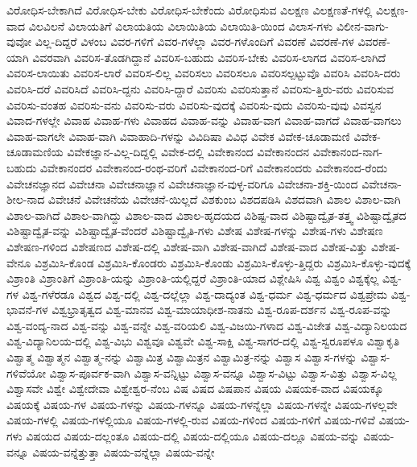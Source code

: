 {ವಿರೋಧಿಸ-ಬೇಕಾಗಿದೆ
ವಿರೋಧಿಸ-ಬೇಕು
ವಿರೋಧಿಸ-ಬೇಕೆಂದು
ವಿರೋಧಿಸುವ
ವಿಲಕ್ಷಣ
ವಿಲಕ್ಷಣತೆ-ಗಳಲ್ಲಿ
ವಿಲಕ್ಷಣ-ವಾದ
ವಿಲವಿಲನೆ
ವಿಲಾಯತಿಗೆ
ವಿಲಾಯತಿಯ
ವಿಲಾಯಿತಿಯ
ವಿಲಾಯಿತಿ-ಯಿಂದ
ವಿಲಾಸ-ಗಳು
ವಿಲೀನ-ವಾಗು-ವುವೋ
ವಿಲ್ಲ-ದಿದ್ದರೆ
ವಿಳಂಬ
ವಿವರ-ಗಳಿಗೆ
ವಿವರ-ಗಳೆಲ್ಲಾ
ವಿವರ-ಗಳೊಂದಿಗೆ
ವಿವರಣೆ
ವಿವರಣೆ-ಗಳ
ವಿವರಣೆ-ಯಾಗಿ
ವಿವರವಾಗಿ
ವಿವರಿಸ-ತೊಡಗಿದ್ದಾನೆ
ವಿವರಿಸ-ಬಹುದು
ವಿವರಿಸ-ಬೇಕು
ವಿವರಿಸ-ಲಾಗದ
ವಿವರಿಸ-ಲಾಗಿದೆ
ವಿವರಿಸ-ಲಾಯಿತು
ವಿವರಿಸ-ಲಾರೆ
ವಿವರಿಸ-ಲಿಲ್ಲ
ವಿವರಿಸಲು
ವಿವರಿಸಲೂ
ವಿವರಿಸಲ್ಪಟ್ಟುವೊ
ವಿವರಿಸಿ
ವಿವರಿಸಿ-ದರು
ವಿವರಿಸಿ-ದರೆ
ವಿವರಿಸಿದೆ
ವಿವರಿಸಿ-ದ್ದನು
ವಿವರಿಸಿ-ದ್ದಾರೆ
ವಿವರಿಸು
ವಿವರಿಸುತ್ತಾನೆ
ವಿವರಿಸು-ತ್ತಿರು-ವರು
ವಿವರಿಸುವ
ವಿವರಿಸು-ವಂತಹ
ವಿವರಿಸು-ವನು
ವಿವರಿಸು-ವರು
ವಿವರಿಸು-ವುದಕ್ಕೆ
ವಿವರಿಸು-ವುದು
ವಿವರಿಸು-ವುವು
ವಿವಸ್ವನ
ವಿವಾದ-ಗಳಲ್ಲೇ
ವಿವಾಹ
ವಿವಾಹ-ಗಳು
ವಿವಾಹದ
ವಿವಾಹ-ವನ್ನು
ವಿವಾಹ-ವಾಗ
ವಿವಾಹ-ವಾಗದೆ
ವಿವಾಹ-ವಾಗಲು
ವಿವಾಹ-ವಾಗಲೇ
ವಿವಾಹ-ವಾಗಿ
ವಿವಾಹಾದಿ-ಗಳನ್ನು
ವಿವಿದಿಷಾ
ವಿವಿಧ
ವಿವೇಕ
ವಿವೇಕ-ಚೂಡಾಮಣಿ
ವಿವೇಕ-ಚೂಡಾಮಣಿಯ
ವಿವೇಕಜ್ಞಾನ-ವಿಲ್ಲ-ದಿದ್ದಲ್ಲಿ
ವಿವೇಕ-ದಲ್ಲಿ
ವಿವೇಕಾನಂದ
ವಿವೇಕಾನಂದನ
ವಿವೇಕಾನಂದ-ನಾಗ-ಬಹುದು
ವಿವೇಕಾನಂದರ
ವಿವೇಕಾನಂದ-ರಂಥ-ವರಿಗೆ
ವಿವೇಕಾನಂದ-ರಿಗೆ
ವಿವೇಕಾನಂದರು
ವಿವೇಕಾನಂದ-ರೆಂದು
ವಿವೇಚನಜ್ಞಾನದ
ವಿವೇಚನಾ
ವಿವೇಚನಾಜ್ಞಾನ
ವಿವೇಚನಾಜ್ಞಾನ-ವುಳ್ಳ-ವರಿಗೂ
ವಿವೇಚನಾ-ಶಕ್ತಿ-ಯಿಂದ
ವಿವೇಚನಾ-ಶೀಲ-ನಾದ
ವಿವೇಚನೆ
ವಿವೇಚನೆಯ
ವಿವೇಚನೆ-ಯಿಲ್ಲದೆ
ವಿಶಕುಂಬ
ವಿಶದಪಡಿಸಿ
ವಿಶದವಾಗಿ
ವಿಶಾಲ
ವಿಶಾಲ-ವಾಗಿ
ವಿಶಾಲ-ವಾಗಿದೆ
ವಿಶಾಲ-ವಾಗಿದ್ದು
ವಿಶಾಲ-ವಾದ
ವಿಶಾಲ-ಹೃದಯದ
ವಿಶಿಷ್ಟ-ವಾದ
ವಿಶಿಷ್ಟಾದ್ವೈತ-ತತ್ತ್ವ
ವಿಶಿಷ್ಟಾದ್ವೈತದ
ವಿಶಿಷ್ಟಾದ್ವೈತ-ವನ್ನು
ವಿಶಿಷ್ಟಾದ್ವೈತ-ವೆಂದರೆ
ವಿಶಿಷ್ಟಾದ್ವೈತಿ-ಗಳು
ವಿಶೇಷ
ವಿಶೇಷ-ಗಳನ್ನು
ವಿಶೇಷ-ಗಳು
ವಿಶೇಷಣ
ವಿಶೇಷಣ-ಗಳಿಂದ
ವಿಶೇಷಣದ
ವಿಶೇಷ-ದಲ್ಲಿ
ವಿಶೇಷ-ವಾಗಿ
ವಿಶೇಷ-ವಾಗಿದೆ
ವಿಶೇಷ-ವಾದ
ವಿಶೇಷ-ವಿತ್ತು
ವಿಶೇಷ-ವೇನೂ
ವಿಶ್ರಮಿಸಿ-ಕೊಂಡ
ವಿಶ್ರಮಿಸಿ-ಕೊಂಡರು
ವಿಶ್ರಮಿಸಿ-ಕೊಂಡು
ವಿಶ್ರಮಿಸಿ-ಕೊಳ್ಳು-ತ್ತಿದ್ದರು
ವಿಶ್ರಮಿಸಿ-ಕೊಳ್ಳು-ವುದಕ್ಕೆ
ವಿಶ್ರಾಂತಿ
ವಿಶ್ರಾಂತಿಗೆ
ವಿಶ್ರಾಂತಿ-ಯನ್ನು
ವಿಶ್ರಾಂತಿ-ಯಲ್ಲಿದ್ದರೆ
ವಿಶ್ರಾಂತಿ-ಯಾದ
ವಿಶ್ಲೇಷಿಸಿ
ವಿಶ್ವ
ವಿಶ್ವಂ
ವಿಶ್ವಕ್ಕೆಲ್ಲ
ವಿಶ್ವ-ಗಳ
ವಿಶ್ವ-ಗಳೆರಡೂ
ವಿಶ್ವದ
ವಿಶ್ವ-ದಲ್ಲಿ
ವಿಶ್ವ-ದಲ್ಲೆಲ್ಲಾ
ವಿಶ್ವ-ದಾದ್ಯಂತ
ವಿಶ್ವ-ಧರ್ಮ
ವಿಶ್ವ-ಧರ್ಮದ
ವಿಶ್ವಪ್ರೇಮ
ವಿಶ್ವ-ಭಾವನೆ-ಗಳ
ವಿಶ್ವಭ್ರಾತೃತ್ವದ
ವಿಶ್ವ-ಮಾನವ
ವಿಶ್ವ-ಮಾಯಾಧೀಶ-ನಾತನು
ವಿಶ್ವ-ರೂಪ-ದರ್ಶನ
ವಿಶ್ವ-ರೂಪ-ವನ್ನು
ವಿಶ್ವ-ವಂದ್ಯ-ನಾದ
ವಿಶ್ವ-ವನ್ನು
ವಿಶ್ವ-ವನ್ನೇ
ವಿಶ್ವ-ವರಿಯಲಿ
ವಿಶ್ವ-ವಿಜಯಿ-ಗಳಾದ
ವಿಶ್ವ-ವಿಜೇತ
ವಿಶ್ವ-ವಿದ್ಯಾನಿಲಯದ
ವಿಶ್ವ-ವಿದ್ಯಾನಿಲಯ-ದಲ್ಲಿ
ವಿಶ್ವ-ವಿಭು
ವಿಶ್ವವೂ
ವಿಶ್ವವೇ
ವಿಶ್ವ-ಸಾಕ್ಷಿ
ವಿಶ್ವ-ಸಾಗರ-ದಲ್ಲಿ
ವಿಶ್ವ-ಸ್ವರೂಪಳೂ
ವಿಶ್ವಾಕೃತಿ
ವಿಶ್ವಾತ್ಮ
ವಿಶ್ವಾತ್ಮನ
ವಿಶ್ವಾತ್ಮ-ನನ್ನು
ವಿಶ್ವಾಮಿತ್ರ
ವಿಶ್ವಾಮಿತ್ರನ
ವಿಶ್ವಾಮಿತ್ರ-ನನ್ನು
ವಿಶ್ವಾಸ
ವಿಶ್ವಾಸ-ಗಳನ್ನು
ವಿಶ್ವಾಸ-ಗಳಿವೆಯೋ
ವಿಶ್ವಾಸ-ಪೂರ್ವಕ-ವಾಗಿ
ವಿಶ್ವಾಸ-ವನ್ನಿಟ್ಟು
ವಿಶ್ವಾಸ-ವನ್ನೂ
ವಿಶ್ವಾಸ-ವಿಟ್ಟು
ವಿಶ್ವಾಸ-ವಿತ್ತು
ವಿಶ್ವಾಸ-ವಿಲ್ಲ
ವಿಶ್ವಾಸವೇ
ವಿಶ್ವೇ
ವಿಶ್ವೇದೇವಾ
ವಿಶ್ವೇಶ್ವರ-ನೆಂಬ
ವಿಷ
ವಿಷದ
ವಿಷಪಾನ
ವಿಷಯ
ವಿಷಯಕ-ವಾದ
ವಿಷಯಕ್ಕೂ
ವಿಷಯಕ್ಕೆ
ವಿಷಯ-ಗಳ
ವಿಷಯ-ಗಳನ್ನು
ವಿಷಯ-ಗಳನ್ನೂ
ವಿಷಯ-ಗಳನ್ನೆಲ್ಲಾ
ವಿಷಯ-ಗಳನ್ನೇ
ವಿಷಯ-ಗಳಲ್ಲವೇ
ವಿಷಯ-ಗಳಲ್ಲಿ
ವಿಷಯ-ಗಳಲ್ಲಿಯೂ
ವಿಷಯ-ಗಳಲ್ಲಿ-ರುವ
ವಿಷಯ-ಗಳಿಂದ
ವಿಷಯ-ಗಳಿಗೆ
ವಿಷಯ-ಗಳಿವೆ
ವಿಷಯ-ಗಳು
ವಿಷಯದ
ವಿಷಯ-ದಲ್ಲಂತೂ
ವಿಷಯ-ದಲ್ಲಿ
ವಿಷಯ-ದಲ್ಲಿಯೂ
ವಿಷಯ-ದಲ್ಲೂ
ವಿಷಯ-ವನ್ನು
ವಿಷಯ-ವನ್ನೂ
ವಿಷಯ-ವನ್ನೆತ್ತುತ್ತಾ
ವಿಷಯ-ವನ್ನೆಲ್ಲಾ
ವಿಷಯ-ವನ್ನೇ
}
